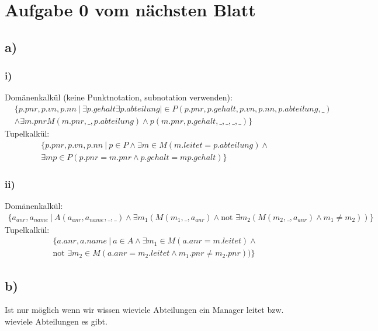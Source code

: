 \section*{Aufgabe 0 vom nächsten Blatt}
\subsection*{a)}
\subsubsection*{i)}
Domänenkalkül (keine Punktnotation, subnotation verwenden):
\begin{align*}
&\{p.pnr,p.vn,p.nn\ |\ \exists p.gehalt \exists p.abteilung | \in P(p.pnr,p.gehalt,p.vn,p.nn,p.abteilung,\_)\\
&\land \exists m.pnr M(m.pnr,\_,p.abteilung)\land p(m.pnr,p.gehalt,\_,\_,\_,\_)\}
\end{align*}
Tupelkalkül:
\begin{align*}
  &\{p.pnr,p.vn,p.nn\ |\ p\in P\land \exists m\in M(m.leitet = p.abteilung)\land\\ 
  &\exists mp\in P(p.pnr = m.pnr \land p.gehalt = mp.gehalt)\}
\end{align*}
\subsubsection*{ii)}
Domänenkalkül:
\begin{align*}
  \{a_{anr},a_{name}\ |\ A(a_{anr},a_{name},\_,\_)\land \exists m_1 (M(m_1,\_,a_{anr})\land \text{not }\exists m_2(M(m_2,\_,a_{anr})\land m_1 \not = m_2))  \}
\end{align*}
Tupelkalkül:
\begin{align*}
&\{a.anr,a.name\ |\ a\in A \land \exists m_1 \in M(a.anr = m.leitet) \land\\
&\text{not }\exists m_2 \in M(a.anr = m_2.leitet \land m_1.pnr \not = m_2.pnr))\}
\end{align*}
\subsection*{b)}
Ist nur möglich wenn wir wissen wieviele Abteilungen ein Manager leitet bzw. wieviele Abteilungen es gibt.
